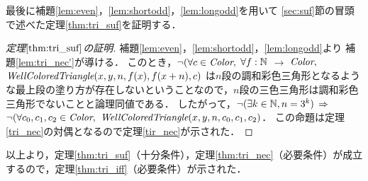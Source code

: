 最後に補題\ref{lem:even}，\ref{lem:shortodd}，\ref{lem:longodd}を用いて
\ref{sec:suf}節の冒頭で述べた定理\ref{thm:tri_suf}を証明する．
\begin{proof}[定理$\ref{thm:tri_suf}$の証明]
  補題\ref{lem:even}，\ref{lem:shortodd}，\ref{lem:longodd}より
  補題\ref{lem:tri_nec'}が導ける．
  このとき，$\lnot( \forall c \in \textit{Color},$ $\forall f:\mathbb{N}$ $\to$ $\textit{Color},$ $\textit{WellColoredTriangle}(x,y,n,f(x),f(x+n),c)$ は$n$段の調和彩色三角形となるような最上段の塗り方が存在しないということなので，$n$段の三色三角形は調和彩色三角形でないことと論理同値である．
  したがって，$\lnot(\exists k \in \mathbb{N}, n = 3 ^ k)$ $\Rightarrow$
  $\lnot( \forall c_0, c_1, c_2 \in \textit{Color},$ $\textit{WellColoredTriangle}(x,y,n,c_0,c_1,c_2)$．
  この命題は定理\ref{tri_nec}の対偶となるので定理\ref{tir_nec}が示された．
\end{proof}

以上より，定理\ref{thm:tri_suf}（十分条件），定理\ref{thm:tri_nec}（必要条件）が成立するので，定理\ref{thm:tri_iff}（必要条件）が示された．
